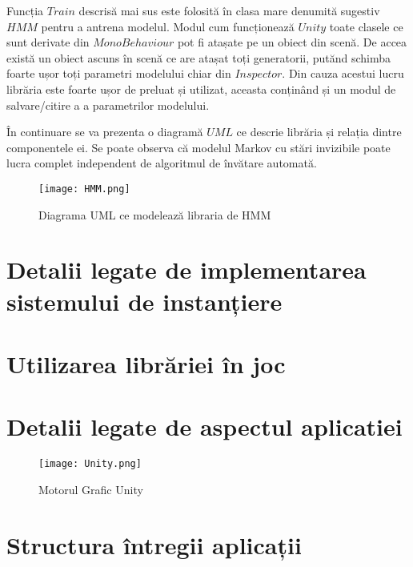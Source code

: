 Funcția $Train$ descrisă mai sus este folosită în clasa mare denumită sugestiv $HMM$ pentru a antrena modelul. Modul cum funcționează $Unity$ toate clasele ce sunt derivate din $MonoBehaviour$ pot fi atașate pe un obiect din scenă. De accea există un obiect ascuns în scenă ce are atașat toți generatorii, putănd schimba foarte ușor toți parametri modelului chiar din $Inspector$. Din cauza acestui lucru librăria este foarte ușor de preluat și utilizat, aceasta conținând și un modul de salvare/citire a a parametrilor modelului.\par

În continuare se va prezenta o diagramă $UML$ ce descrie librăria și relația dintre componentele ei. Se poate observa că modelul Markov cu stări invizibile poate lucra complet independent de algoritmul de învătare automată.\par

\vspace{10mm}
\begin{figure}[H]
\centering
\texttt{[image: HMM.png]} \par
\caption{Diagrama UML ce modelează libraria de HMM}
\end{figure}

\section{Detalii legate de implementarea sistemului de instanțiere}

\section{Utilizarea librăriei în joc}

\section{Detalii legate de aspectul aplicatiei}

\vspace{10mm}
\begin{figure}[H]
\centering
\texttt{[image: Unity.png]} \par
\caption{Motorul Grafic Unity}
\end{figure}

\section{Structura întregii aplicații}